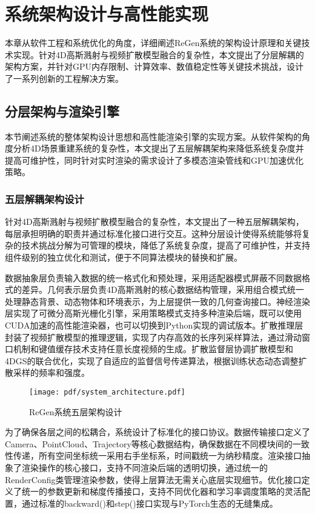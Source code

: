 
\chapter{系统架构设计与高性能实现}

本章从软件工程和系统优化的角度，详细阐述ReGen系统的架构设计原理和关键技术实现。针对4D高斯溅射与视频扩散模型融合的复杂性，本文提出了分层解耦的架构方案，并针对GPU内存限制、计算效率、数值稳定性等关键技术挑战，设计了一系列创新的工程解决方案。

\section{分层架构与渲染引擎}

本节阐述系统的整体架构设计思想和高性能渲染引擎的实现方案。从软件架构的角度分析4D场景重建系统的复杂性，本文提出了五层解耦架构来降低系统复杂度并提高可维护性，同时针对实时渲染的需求设计了多模态渲染管线和GPU加速优化策略。

\subsection{五层解耦架构设计}

针对4D高斯溅射与视频扩散模型融合的复杂性，本文提出了一种五层解耦架构，每层承担明确的职责并通过标准化接口进行交互。这种分层设计使得系统能够将复杂的技术挑战分解为可管理的模块，降低了系统复杂度，提高了可维护性，并支持组件级别的独立优化和测试，便于不同算法模块的替换和扩展。

数据抽象层负责输入数据的统一格式化和预处理，采用适配器模式屏蔽不同数据格式的差异。几何表示层负责4D高斯溅射的核心数据结构管理，采用组合模式统一处理静态背景、动态物体和环境表示，为上层提供一致的几何查询接口。神经渲染层实现了可微分高斯光栅化引擎，采用策略模式支持多种渲染后端，既可以使用CUDA加速的高性能渲染器，也可以切换到Python实现的调试版本。扩散推理层封装了视频扩散模型的推理逻辑，实现了内存高效的长序列采样算法，通过滑动窗口机制和键值缓存技术支持任意长度视频的生成。扩散监督层协调扩散模型和4DGS的联合优化，实现了自适应的监督信号传递算法，根据训练状态动态调整扩散采样的频率和强度。

\begin{figure}[htbp]
  \centering
  \texttt{[image: pdf/system\_architecture.pdf]}
  \caption{ReGen系统五层架构设计}
  \label{fig:system-architecture}
\end{figure}

为了确保各层之间的松耦合，系统设计了标准化的接口协议。数据传输接口定义了Camera、PointCloud、Trajectory等核心数据结构，确保数据在不同模块间的一致性传递，所有空间坐标统一采用右手坐标系，时间戳统一为纳秒精度。渲染接口抽象了渲染操作的核心接口，支持不同渲染后端的透明切换，通过统一的RenderConfig类管理渲染参数，使得上层算法无需关心底层实现细节。优化接口定义了统一的参数更新和梯度传播接口，支持不同优化器和学习率调度策略的灵活配置，通过标准的backward()和step()接口实现与PyTorch生态的无缝集成。

